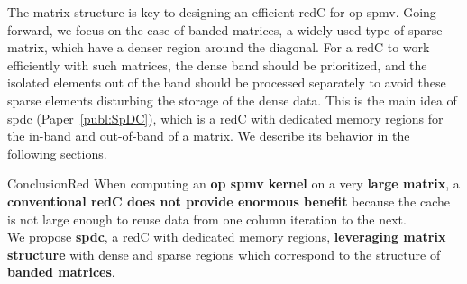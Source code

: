 The matrix structure is key to designing an efficient \gls{redC} for \acrshort{op} \acrshort{spmv}.
Going forward, we focus on the case of \gls{banded} matrices, a widely used type of sparse matrix, which have a denser region around the diagonal.
For a \gls{redC} to work efficiently with such matrices, the dense \gls{band} should be prioritized, and the isolated elements out of the \gls{band} should be processed separately to avoid these sparse elements disturbing the storage of the dense data.
This is the main idea of \acrlong{spdc} (Paper~\ref{publ:SpDC}), which is a \gls{redC} with dedicated memory regions for the in-\gls{band} and out-of-\gls{band} of a matrix.
We describe its behavior in the following sections.

\begin{highlight}{Conclusion}{Red}
    When computing an \textbf{\acrshort{op} \acrshort{spmv} kernel} on a very \textbf{large matrix}, a \textbf{conventional \gls{redC} does not provide enormous benefit} because the cache is not large enough to reuse data from one column iteration to the next.
    \bigskip \\
    We propose \textbf{\acrlong{spdc}}, a \gls{redC} with dedicated memory regions, \textbf{leveraging matrix structure} with dense and sparse regions which correspond to the structure of \textbf{\gls{banded} matrices}.
\end{highlight}
